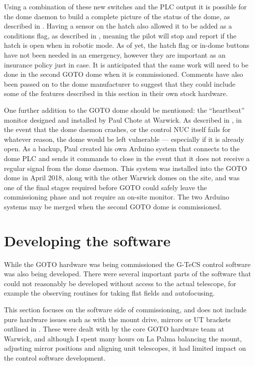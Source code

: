 \begin{colsection}
Using a combination of these new switches and the PLC output it is possible for the dome daemon to build a complete picture of the status of the dome, as described in . Having a sensor on the hatch also allowed it to be added as a conditions flag, as described in , meaning the pilot will stop and report if the hatch is open when in robotic mode. As of yet, the hatch flag or in-dome buttons have not been needed in an emergency, however they are important as an insurance policy just in case. It is anticipated that the same work will need to be done in the second GOTO dome when it is commissioned. Comments have also been passed on to the dome manufacturer to suggest that they could include some of the features described in this section in their own stock hardware.

One further addition to the GOTO dome should be mentioned: the ``heartbeat'' monitor designed and installed by Paul Chote at Warwick. As described in , in the event that the dome daemon crashes, or the control NUC itself fails for whatever reason, the dome would be left vulnerable --- especially if it is already open. As a backup, Paul created his own Arduino system that connects to the dome PLC and sends it commands to close in the event that it does not receive a regular signal from the dome daemon. This system was installed into the GOTO dome in April 2018, along with the other Warwick domes on the site, and was one of the final stages required before GOTO could safely leave the commissioning phase and not require an on-site monitor. The two Arduino systems may be merged when the second GOTO dome is commissioned.

\end{colsection}


\section{Developing the software}
\label{sec:software_commissioning}


\begin{colsection}

While the GOTO hardware was being commissioned the G-TeCS control software was also being developed. There were several important parts of the software that could not reasonably be developed without access to the actual telescope, for example the observing routines for taking flat fields and autofocusing.

This section focuses on the software side of commissioning, and does not include pure hardware issues such as with the mount drive, mirrors or UT brackets outlined in . These were dealt with by the core GOTO hardware team at Warwick, and although I spent many hours on La Palma balancing the mount, adjusting mirror positions and aligning unit telescopes, it had limited impact on the control software development.

\end{colsection}

